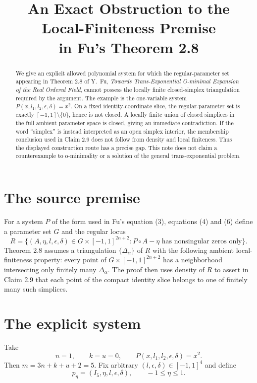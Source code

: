 \documentclass[11pt]{article}
\title{An Exact Obstruction to the Local-Finiteness Premise\\in Fu's Theorem 2.8}
\author{}
\date{}
\begin{document}
\maketitle

\begin{abstract}
We give an explicit allowed polynomial system for which the regular-parameter
set appearing in Theorem 2.8 of Y.~Fu, \emph{Towards Trans-Exponential
O-minimal Expansion of the Real Ordered Field}, cannot possess the locally
finite closed-simplex triangulation required by the argument.  The example is
the one-variable system $P(x,l_1,l_2,\epsilon,\delta)=x^2$.  On a fixed
identity-coordinate slice, the regular-parameter set is exactly
$[-1,1]\setminus\{0\}$, hence is not closed.  A locally finite union of closed
simplices in the full ambient parameter space is closed, giving an immediate
contradiction.  If the word ``simplex'' is instead interpreted as an open
simplex interior, the membership conclusion used in Claim 2.9 does not follow
from density and local finiteness.  Thus the displayed construction route has
a precise gap.  This note does not claim a counterexample to o-minimality or a
solution of the general trans-exponential problem.
\end{abstract}

\section{The source premise}

For a system $P$ of the form used in Fu's equation (3), equations (4) and (6)
define a parameter set $G$ and the regular locus
\[
 R=\bigl\{(A,\eta,l,\epsilon,\delta)\in
 G\times[-1,1]^{2n+2}: P\circ A-\eta
 \text{ has nonsingular zeros only}\bigr\}.
\]
Theorem 2.8 assumes a triangulation $\{\Delta_\alpha\}$ of $R$ with the
following ambient local-finiteness property: every point of
$G\times[-1,1]^{2n+2}$ has a neighborhood intersecting only finitely many
$\Delta_\alpha$.  The proof then uses density of $R$ to assert in Claim 2.9
that each point of the compact identity slice belongs to one of finitely many
such simplices.

\section{The explicit system}

Take
\[
 n=1,\qquad k=u=0,\qquad
 P(x,l_1,l_2,\epsilon,\delta)=x^2.
\]
Then $m=3n+k+u+2=5$.  Fix arbitrary
$(l,\epsilon,\delta)\in[-1,1]^4$ and define
\[
 p_\eta=(I_5,\eta,l,\epsilon,\delta),\qquad -1\leq\eta\leq1.
\]
\end{document}
